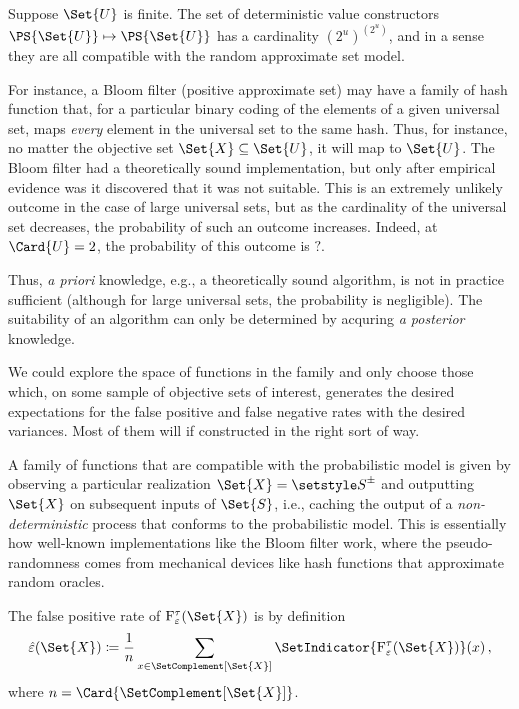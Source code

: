 \documentclass[10pt,final,hidelinks]{article}
\numberwithin{equation}{section}
\begin{document}
Suppose $\Set{U}$ is finite. The set of deterministic value constructors $\PS{\Set{U}} \mapsto \PS{\Set{U}}$ has a cardinality $(2^u)^(2^u)$, and in a sense they are all compatible with the random approximate set model.

For instance, a Bloom filter (positive approximate set) may have a family of hash function that, for a particular binary coding of the elements of a given universal set, maps \emph{every} element in the universal set to the same hash.
Thus, for instance, no matter the objective set $\Set{X} \subseteq \Set{U}$, it will map to $\Set{U}$.
The Bloom filter had a theoretically sound implementation, but only after empirical evidence was it discovered that it was not suitable.
This is an extremely unlikely outcome in the case of large universal sets, but as the cardinality of the universal set decreases, the probability of such an outcome increases.
Indeed, at $\Card{U} = 2$, the probability of this outcome is $?$.

Thus, \emph{a priori} knowledge, e.g., a theoretically sound algorithm, is not in practice sufficient (although for large universal sets, the probability is negligible).
The suitability of an algorithm can only be determined by acquring \emph{a posterior} knowledge.

We could explore the space of functions in the family and only choose those which, on some sample of objective sets of interest, generates the desired expectations for the false positive and false negative rates with the desired variances.
Most of them will if constructed in the right sort of way.

A family of functions that are compatible with the probabilistic model is given by observing a particular realization $\Set{X} = \ASet{S}$ and outputting 
$\Set{X}$ on subsequent inputs of $\Set{S}$, i.e., caching the output of a \emph{non-deterministic} process that conforms to the probabilistic model.
This is essentially how well-known implementations like the Bloom filter work, where the pseudo-randomness comes from mechanical devices like hash functions that approximate random oracles.

The false positive rate of $\ctor{\fprate}{\tprate}(\Set{X})$ is by definition
\begin{equation}
    \fprateob(\Set{X}) \coloneqq \frac{1}{\n} \sum_{x \in \SetComplement[\Set{X}]} \SetIndicator{\ctor{\fprate}{\tprate}(\Set{X})}(x)\,,
\end{equation}
where $\n = \Card{\SetComplement[\Set{X}]}$.
\end{document}
